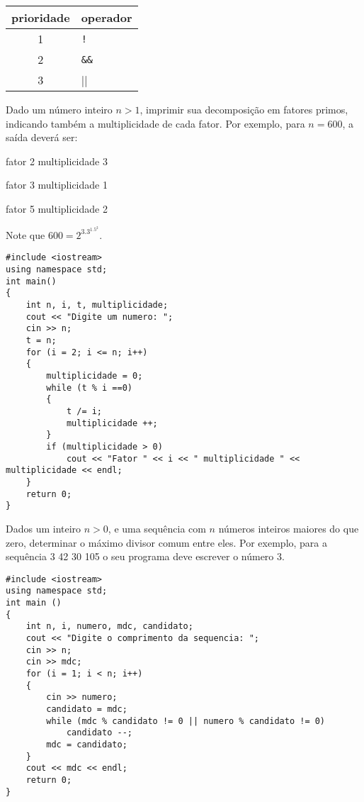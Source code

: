 \documentclass[a4paper]{memoir}
\begin{document}
\begin{center}
\begin{tabular}{c|l}
  prioridade  & operador \\
  \hline
  1 & \verb|!|  \\
  2 & \verb|&&| \\
  3 & \verb|||| \\
\end{tabular}
\end{center}

\begin{prob}\label{prob112.cpp}
Dado um número inteiro $n > 1$, imprimir sua decomposição em fatores primos, indicando também a multiplicidade de cada fator. Por exemplo, para $n = 600$, a saída deverá ser:

\noindent fator 2 multiplicidade 3

\noindent fator 3 multiplicidade 1

\noindent fator 5 multiplicidade 2

\noindent Note que $600 = 2^3.3^1.5^2$.
\end{prob}

\newpage

\begin{sol}
\begin{lstlisting}
#include <iostream>
using namespace std;
int main()
{
    int n, i, t, multiplicidade;
    cout << "Digite um numero: ";
    cin >> n;
    t = n;
    for (i = 2; i <= n; i++)
    {
        multiplicidade = 0;
        while (t % i ==0)
        {
            t /= i;
            multiplicidade ++;
        }
        if (multiplicidade > 0)
            cout << "Fator " << i << " multiplicidade " << multiplicidade << endl;
    }
    return 0;
}
\end{lstlisting}

\end{sol}

\begin{prob}\label{prob113.cpp}
Dados um inteiro $n > 0$, e uma sequência com $n$ números inteiros maiores do que zero, determinar o máximo divisor comum entre eles. Por exemplo, para a sequência 3 42 30 105 o seu programa deve escrever o número 3.
\end{prob}

\begin{sol}
\begin{lstlisting}
#include <iostream>
using namespace std;
int main ()
{
    int n, i, numero, mdc, candidato;
    cout << "Digite o comprimento da sequencia: ";
    cin >> n;
    cin >> mdc;
    for (i = 1; i < n; i++)
    {
        cin >> numero;
        candidato = mdc;
        while (mdc % candidato != 0 || numero % candidato != 0)
            candidato --;
        mdc = candidato;
    }
    cout << mdc << endl;
    return 0;
}
\end{lstlisting}
\end{sol}
\end{document}
